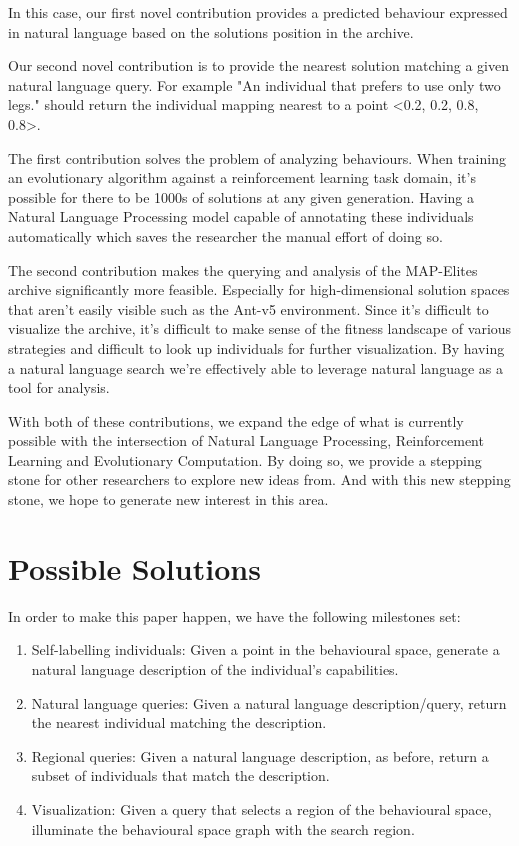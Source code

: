 \documentclass[11pt]{article}
\begin{document}
In this case, our first novel contribution provides a predicted behaviour expressed in natural language
based on the solutions position in the archive.

Our second novel contribution is to provide the nearest solution matching a given natural language query.
For example "An individual that prefers to use only two legs." should return the individual mapping nearest to a point
<0.2, 0.2, 0.8, 0.8>.

The first contribution solves the problem of analyzing behaviours. When training an evolutionary algorithm
against a reinforcement learning task domain, it's possible for there to be 1000s of solutions at any given generation.
Having a Natural Language Processing model capable of annotating these individuals automatically which saves the
researcher the manual effort of doing so.

The second contribution makes the querying and analysis of the MAP-Elites archive significantly more feasible.
Especially for high-dimensional solution spaces that aren't easily visible such as the Ant-v5 environment.
Since it's difficult to visualize the archive, it's difficult to make sense of the fitness landscape
of various strategies and difficult to look up individuals for further visualization. By having a natural language
search we're effectively able to leverage natural language as a tool for analysis.

With both of these contributions, we expand the edge of what is currently possible with
the intersection of Natural Language Processing, Reinforcement Learning and Evolutionary Computation.
By doing so, we provide a stepping stone for other researchers to explore new ideas from.
And with this new stepping stone, we hope to generate new interest in this area.

\section{Possible Solutions}
\label{sec:org5c21b25}

In order to make this paper happen, we have the following milestones set:

\begin{enumerate}
\item Self-labelling individuals: Given a point in the behavioural space, generate a natural language description
of the individual's capabilities.

\item Natural language queries: Given a natural language description/query, return the nearest individual
matching the description.

\item Regional queries: Given a natural language description, as before, return a subset of individuals
that match the description.

\item Visualization: Given a query that selects a region of the behavioural space, illuminate the behavioural
space graph with the search region.
\end{enumerate}
\end{document}
